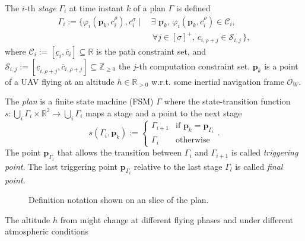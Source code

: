 \begin{highlight}  
  \begin{defn}\label{def:mission}
    The $i$-th \emph{stage} $\Gamma_i$ at time instant $k$ of a plan $\Gamma$ is defined
    \begin{equation*}\begin{split}
      \Gamma_i:=\{\varphi_i(\mathbf{p}_k,c_i^\rho),c_i^\sigma\mid
      \,&\exists\,\,\mathbf{p}_k,\,\varphi_i(\mathbf{p}_k,c_i^\rho)\in\mathcal{C}_i,\,\\
        &\,\forall j\in[\sigma]^+,\,c_{i,\rho+j}\in\mathcal{S}_{i,j}\,\},
    \end{split}\end{equation*}
    where $\mathcal{C}_i:=[\underline{c}_i,\overline{c}_i]\subseteq\mathbb{R}$ is the path constraint set, and $\mathcal{S}_{i,j}:=[\underline{c}_{i,\rho+j},\overline{c}_{i,\rho+j}]\subseteq\mathbb{Z}_{\geq 0}$ the $j$-th computation constraint set. $\mathbf{p}_k$ is a point of a UAV flying at an altitude $h\in\mathbb{R}_{>0}$ w.r.t. some inertial navigation frame $\mathcal{O}_W$.
  
    The \emph{plan} is a finite state machine (FSM) $\Gamma$ where the state-transition function $s:\bigcup_i{\Gamma_i}\times\mathbb{R}^2\rightarrow\bigcup_i{\Gamma_i}$ maps a stage and a point to the next stage
    \begin{equation*}s(\Gamma_i,\mathbf{p}_k):=\begin{cases}
      \Gamma_{i+1} & \text{if }\mathbf{p}_k=\mathbf{p}_{\Gamma_i}\\
      \Gamma_i & \text{otherwise}
    \end{cases}.\end{equation*}
    The point $\mathbf{p}_{\Gamma_{i}}$ that allows the transition between $\Gamma_i$ and $\Gamma_{i+1}$ is called \emph{triggering point}. The last triggering point $\mathbf{p}_{\Gamma_{l}}$ relative to the last stage $\Gamma_l$ is called \emph{final point}.
  \end{defn}
\end{highlight}

\begin{figure}[t]
    \centering
    
    \caption[Definition notation on a slice of the plan]{Definition notation shown on an slice of the plan.}
    \label{fig:traj1}
\end{figure}

The altitude $h$ from  might change at different flying phases and under different atmospheric conditions

